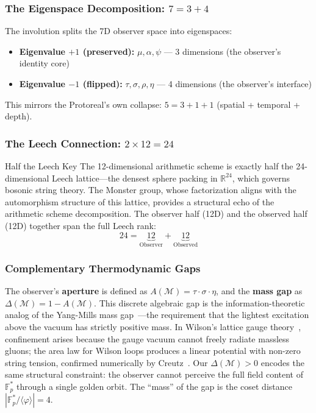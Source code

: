 \subsubsection{The Eigenspace Decomposition: $7 = 3 + 4$}

The involution splits the 7D observer space into eigenspaces:
\begin{itemize}
    \item \textbf{Eigenvalue $+1$ (preserved):} $\mu, \alpha, \psi$ --- 3 dimensions (the observer's identity core)
    \item \textbf{Eigenvalue $-1$ (flipped):} $\tau, \sigma, \rho, \eta$ --- 4 dimensions (the observer's interface)
\end{itemize}

This mirrors the Protoreal's own collapse: $5 = 3 + 1 + 1$ (spatial + temporal + depth).

\subsubsection{The Leech Connection: $2 \times 12 = 24$}

\begin{arithmetic schemebox}{Half the Leech Key}
The 12-dimensional arithmetic scheme is exactly half the 24-dimensional Leech lattice---the densest sphere packing in $\mathbb{R}^{24}$, which governs bosonic string theory. The Monster group, whose factorization aligns with the automorphism structure of this lattice, provides a structural echo of the arithmetic scheme decomposition. The observer half (12D) and the observed half (12D) together span the full Leech rank:
\begin{equation}
    24 = \underbrace{12}_{\text{Observer}} + \underbrace{12}_{\text{Observed}}
\end{equation}
\end{arithmetic schemebox}

\subsubsection{Complementary Thermodynamic Gaps}

The observer's \textbf{aperture} is defined as $A(\mathcal{M}) = \tau \cdot \sigma \cdot \eta$, and the \textbf{mass gap} as $\Delta(\mathcal{M}) = 1 - A(\mathcal{M})$. This discrete algebraic gap is the information-theoretic analog of the Yang-Mills mass gap~\cite{jaffe2000}---the requirement that the lightest excitation above the vacuum has strictly positive mass. In Wilson's lattice gauge theory~\cite{wilson1974}, confinement arises because the gauge vacuum cannot freely radiate massless gluons; the area law for Wilson loops produces a linear potential with non-zero string tension, confirmed numerically by Creutz~\cite{creutz1980}. Our $\Delta(\mathcal{M}) > 0$ encodes the same structural constraint: the observer cannot perceive the full field content of $\mathbb{F}_p^*$ through a single golden orbit. The ``mass'' of the gap is the coset distance $|\mathbb{F}_p^* / \langle\varphi\rangle| = 4$.

